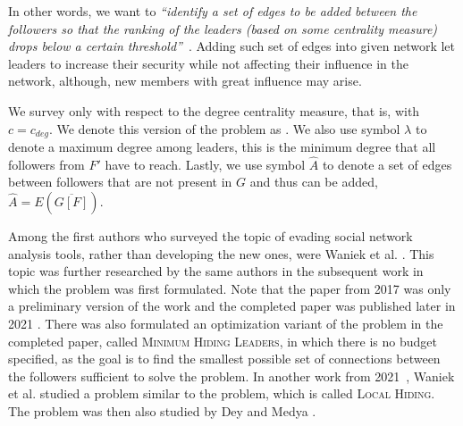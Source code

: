 In other words, we want to \emph{``identify a set of edges to be added between the followers so that
the ranking of the leaders (based on some centrality measure) drops below a certain threshold''}~\cite{Waniek2017}.
Adding such set of edges into given network let leaders to increase their security while not affecting their
influence in the network, although, new members with great influence may arise.

We survey \HLshort only with respect to the degree centrality measure, that is, with $c = c_{deg}$.
We denote this version of the problem as \HLdeg.
We also use symbol $\lambda$ to denote a maximum degree among leaders, this is the minimum degree that
all followers from $F'$ have to reach.
Lastly, we use symbol $\hat{A}$ to denote a set of edges between followers that are not present in $G$ and thus can be added,
$\hat{A} = E(\overline{G[F]})$.

Among the first authors who surveyed the topic of evading social network analysis tools, rather than developing the new ones,
were Waniek et al. \cite{Waniek2016}.
This topic was further researched by the same authors in the subsequent work \cite{Waniek2017}
in which the \HL problem was first formulated.
Note that the paper from 2017 was only a preliminary version of the work and the completed paper was
published later in 2021 \cite{Waniek2021full}.
There was also formulated an optimization variant of the \HL problem in the completed paper, called \textsc{Minimum Hiding Leaders}, 
in which there is no budget specified, as the goal is to find the smallest possible set of connections between the followers
sufficient to solve the problem.
In another work from 2021~\cite{Waniek2021}, Waniek et al. studied a problem similar to the \HL problem,
which is called \textsc{Local Hiding}.
The \HL problem was then also studied by Dey and Medya \cite{Dey2019}.


